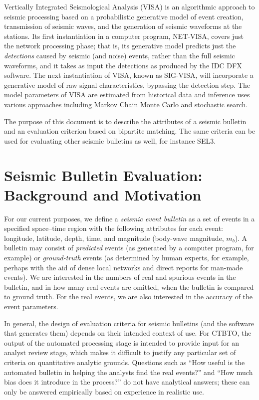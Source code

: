 \documentclass[a4paper,12pt]{article}
\begin{document}
Vertically Integrated Seismological Analysis (VISA) is an algorithmic
approach to seismic processing based on a probabilistic generative
model of event creation, transmission of seismic waves, and the
generation of seismic waveforms at the stations. Its first
instantiation in a computer program, NET-VISA, covers just the network
processing phase; that is, its generative model predicts just the {\em
  detections} caused by seismic (and noise) events, rather than the
full seismic waveforms, and it takes as input the detections as
produced by the IDC DFX software. The next instantiation of VISA,
known as SIG-VISA, will incorporate a generative model of raw signal
characteristics, bypassing the detection step. The model parameters of
VISA are estimated from historical data and inference uses various
approaches including Markov Chain Monte Carlo and stochastic search.

The purpose of this document is to describe the attributes of a seismic
bulletin and an evaluation criterion based on bipartite matching. The
same criteria can be used for evaluating other seismic bulletins as
well, for instance SEL3.

\section{Seismic Bulletin Evaluation: Background and Motivation}
\label{sec-eval}

For our current purposes, we define a {\em seismic event bulletin} as a set of events in a specified
space--time region with the following attributes for each event:
longitude, latitude, depth, time, and magnitude (body-wave magnitude,
$m_b$). A bulletin may consist of {\em predicted} events (as generated
by a computer program, for example) or {\em ground-truth} events (as
determined by human experts, for example, perhaps with the aid of
dense local networks and direct reports for man-made events).
We are interested in the numbers of real and spurious events
in the bulletin, and in how many real events are omitted, when the
bulletin is compared to ground truth. For the real events, we are also
interested in the accuracy of the event parameters.

In general, the design of evaluation criteria for seismic bulletins
(and the software that generates them) depends on their intended
context of use. For CTBTO, the output of the automated processing
stage is intended to provide input for an analyst review stage, which
makes it difficult to justify any particular set of criteria on
quantitative analytic grounds. Questions such as ``How useful is the
automated bulletin in helping the analysts find the real events?'' and
``How much bias does it introduce in the process?'' do not have
analytical answers; these can only be answered empirically based on
experience in realistic use.
\end{document}
